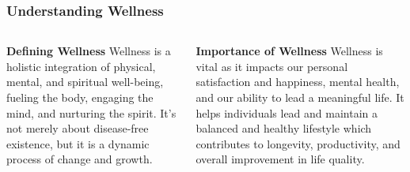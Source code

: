 \documentclass[5pt]{beamer}
\begin{document}
\begin{frame}
\frametitle{Understanding Wellness}
\begin{columns}
\begin{column}{0.45\textwidth}
\begin{block}{\textbf{Defining Wellness}}
Wellness is a holistic integration of physical, mental, and spiritual well-being, fueling the body, engaging the mind, and nurturing the spirit. It's not merely about disease-free existence, but it is a dynamic process of change and growth.
\end{block}
\end{column}
\begin{column}{0.45\textwidth}
\begin{block}{\textbf{Importance of Wellness}}
Wellness is vital as it impacts our personal satisfaction and happiness, mental health, and our ability to lead a meaningful life. It helps individuals lead and maintain a balanced and healthy lifestyle which contributes to longevity, productivity, and overall improvement in life quality.
\end{block}
\end{column}
\end{columns}
\end{frame}
\end{document}
